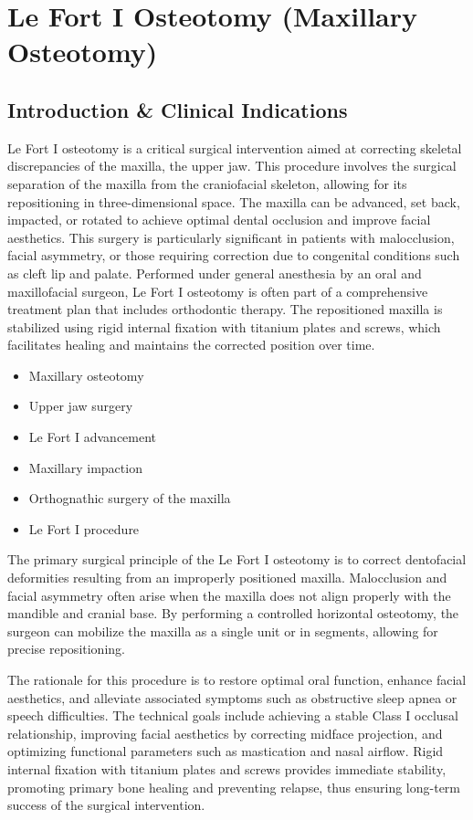 \chapter{Le Fort I Osteotomy (Maxillary Osteotomy)}

\section*{Introduction \& Clinical Indications}
Le Fort I osteotomy is a critical surgical intervention aimed at correcting skeletal discrepancies of the maxilla, the upper jaw. This procedure involves the surgical separation of the maxilla from the craniofacial skeleton, allowing for its repositioning in three-dimensional space. The maxilla can be advanced, set back, impacted, or rotated to achieve optimal dental occlusion and improve facial aesthetics. This surgery is particularly significant in patients with malocclusion, facial asymmetry, or those requiring correction due to congenital conditions such as cleft lip and palate. Performed under general anesthesia by an oral and maxillofacial surgeon, Le Fort I osteotomy is often part of a comprehensive treatment plan that includes orthodontic therapy. The repositioned maxilla is stabilized using rigid internal fixation with titanium plates and screws, which facilitates healing and maintains the corrected position over time.

\begin{itemize}
  \item Maxillary osteotomy
  \item Upper jaw surgery
  \item Le Fort I advancement
  \item Maxillary impaction
  \item Orthognathic surgery of the maxilla
  \item Le Fort I procedure
\end{itemize}

The primary surgical principle of the Le Fort I osteotomy is to correct dentofacial deformities resulting from an improperly positioned maxilla. Malocclusion and facial asymmetry often arise when the maxilla does not align properly with the mandible and cranial base. By performing a controlled horizontal osteotomy, the surgeon can mobilize the maxilla as a single unit or in segments, allowing for precise repositioning.

The rationale for this procedure is to restore optimal oral function, enhance facial aesthetics, and alleviate associated symptoms such as obstructive sleep apnea or speech difficulties. The technical goals include achieving a stable Class I occlusal relationship, improving facial aesthetics by correcting midface projection, and optimizing functional parameters such as mastication and nasal airflow. Rigid internal fixation with titanium plates and screws provides immediate stability, promoting primary bone healing and preventing relapse, thus ensuring long-term success of the surgical intervention.

